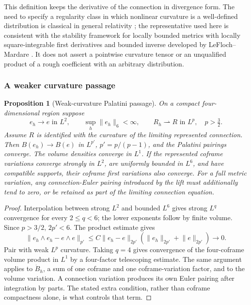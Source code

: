 \documentclass[11pt]{article}
\numberwithin{equation}{section}
\newtheorem{proposition}[proposition]{Proposition}
\theoremstyle{definition}
\theoremstyle{remark}
\newcommand{\norm}[1]{\lVert#1\rVert}
\begin{document}
This definition keeps the derivative of the connection in divergence form.
The need to specify a regularity class in which nonlinear curvature is a
well-defined distribution is classical in general relativity
\cite{GerochTraschen1987}; the representative used here is consistent with
the stability framework for locally bounded metrics with locally
square-integrable first derivatives and bounded inverse developed by
LeFloch--Mardare \cite{LeFlochMardare2007}.  It does not assert a pointwise
curvature tensor or an unqualified product of a rough coefficient with an
arbitrary distribution.

\subsubsection{A weaker curvature passage}

\begin{proposition}[Weak-curvature Palatini passage]
\label{prop:weak-palatini}
On a compact four-dimensional region suppose
\begin{equation}
 e_h\to e\text{ in }L^2,\qquad
 \sup_h\norm{e_h}_6<\infty,\qquad
 R_h\rightharpoonup R\text{ in }L^p,
 \quad p>\tfrac32.
 \label{eq:Palatini-hypotheses}
\end{equation}
Assume $R$ is identified with the curvature of the limiting represented connection. Then $B(e_h)\to B(e)$ in $L^{p'}$, $p'=p/(p-1)$, and the Palatini pairings converge. The volume densities converge in $L^1$. If the represented coframe variations converge strongly in $L^2$, are uniformly bounded in $L^6$, and have compatible supports, their coframe first variations also converge. For a full metric variation, any connection-Euler pairing introduced by the lift must additionally tend to zero, or be retained as part of the limiting connection equation.
\end{proposition}
\begin{proof}
Interpolation between strong $L^2$ and bounded $L^6$ gives strong $L^q$ convergence for every $2\le q<6$; the lower exponents follow by finite volume. Since $p>3/2$, $2p'<6$. The product estimate gives
\[
 \norm{e_h\wedge e_h-e\wedge e}_{p'}
 \le C\norm{e_h-e}_{2p'}(\norm{e_h}_{2p'}+\norm e_{2p'})\to0.
\]
Pair with weak $L^p$ curvature. Taking $q=4$ gives convergence of the four-coframe volume product in $L^1$ by a four-factor telescoping estimate. The same argument applies to $\dot B_h$, a sum of one coframe and one coframe-variation factor, and to the volume variation. A connection variation produces its own Euler pairing after integration by parts. The stated extra condition, rather than coframe compactness alone, is what controls that term.
\end{proof}
\end{document}
